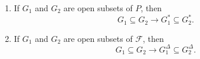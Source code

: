 \begin{enumerate}
\item If $G_1$ and $G_2$ are open subsets of $P$, then
$$G_1 \subseteq G_2 \rightarrow G_1^* \subseteq G_2^*.$$
\item If $G_1$ and $G_2$ are open subsets of $\mathcal{F}$, then
$$G_1 \subseteq G_2 \rightarrow G_1^\Delta \subseteq G_2^\Delta.$$
\end{enumerate}
